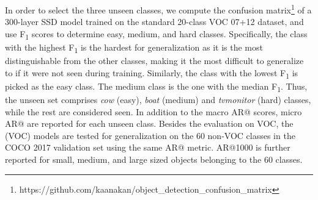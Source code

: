 \documentclass[10pt,twocolumn,letterpaper]{article}
\begin{document}
In order to select the three unseen classes, we compute the confusion matrix\footnote{https://github.com/kaanakan/object\_detection\_confusion\_matrix} of a 300-layer SSD model trained on the standard 20-class VOC 07+12 dataset, and use F\textsubscript{1} scores to determine easy, medium, and hard classes. Specifically, the class with the highest F\textsubscript{1} is the hardest for generalization as it is the most distinguishable from the other classes, making it the most difficult to generalize to if it were not seen during training. Similarly, the class with the lowest F\textsubscript{1} is picked as the easy class. The medium class is the one with the median F\textsubscript{1}. Thus, the unseen set comprises \textit{cow} (easy), \textit{boat} (medium) and \textit{tvmonitor} (hard) classes, while the rest are considered seen. In addition to the macro AR@ scores, micro AR@ are reported for each unseen class. Besides the evaluation on VOC, the (VOC) models are tested for generalization on the 60 non-VOC classes in the COCO 2017 validation set using the same AR@ metric. AR@1000 is further reported for small, medium, and large sized objects belonging to the 60 classes.
\end{document}
